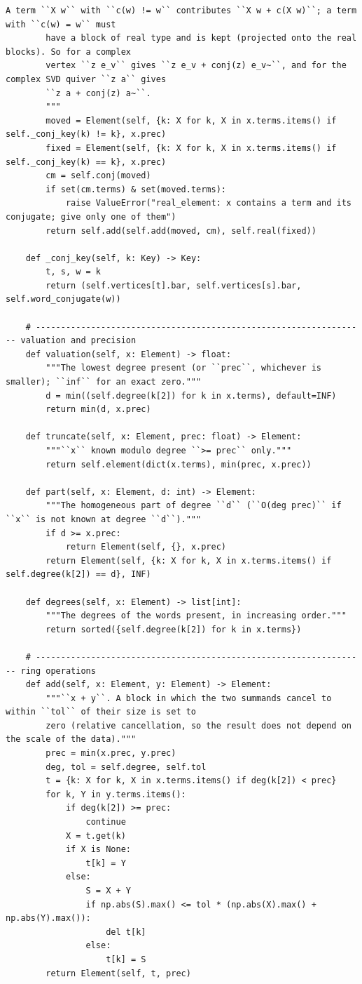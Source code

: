 \documentclass[12pt, a4paper]{report}
\theoremstyle{plain}
\theoremstyle{definition}
\theoremstyle{remark}
\theoremstyle{plain}
\begin{document}
\begin{lstlisting}[style=dsqcode]
        A term ``X w`` with ``c(w) != w`` contributes ``X w + c(X w)``; a term with ``c(w) = w`` must
        have a block of real type and is kept (projected onto the real blocks). So for a complex
        vertex ``z e_v`` gives ``z e_v + conj(z) e_v~``, and for the complex SVD quiver ``z a`` gives
        ``z a + conj(z) a~``.
        """
        moved = Element(self, {k: X for k, X in x.terms.items() if self._conj_key(k) != k}, x.prec)
        fixed = Element(self, {k: X for k, X in x.terms.items() if self._conj_key(k) == k}, x.prec)
        cm = self.conj(moved)
        if set(cm.terms) & set(moved.terms):
            raise ValueError("real_element: x contains a term and its conjugate; give only one of them")
        return self.add(self.add(moved, cm), self.real(fixed))

    def _conj_key(self, k: Key) -> Key:
        t, s, w = k
        return (self.vertices[t].bar, self.vertices[s].bar, self.word_conjugate(w))

    # ------------------------------------------------------------------ valuation and precision
    def valuation(self, x: Element) -> float:
        """The lowest degree present (or ``prec``, whichever is smaller); ``inf`` for an exact zero."""
        d = min((self.degree(k[2]) for k in x.terms), default=INF)
        return min(d, x.prec)

    def truncate(self, x: Element, prec: float) -> Element:
        """``x`` known modulo degree ``>= prec`` only."""
        return self.element(dict(x.terms), min(prec, x.prec))

    def part(self, x: Element, d: int) -> Element:
        """The homogeneous part of degree ``d`` (``O(deg prec)`` if ``x`` is not known at degree ``d``)."""
        if d >= x.prec:
            return Element(self, {}, x.prec)
        return Element(self, {k: X for k, X in x.terms.items() if self.degree(k[2]) == d}, INF)

    def degrees(self, x: Element) -> list[int]:
        """The degrees of the words present, in increasing order."""
        return sorted({self.degree(k[2]) for k in x.terms})

    # ------------------------------------------------------------------ ring operations
    def add(self, x: Element, y: Element) -> Element:
        """``x + y``. A block in which the two summands cancel to within ``tol`` of their size is set to
        zero (relative cancellation, so the result does not depend on the scale of the data)."""
        prec = min(x.prec, y.prec)
        deg, tol = self.degree, self.tol
        t = {k: X for k, X in x.terms.items() if deg(k[2]) < prec}
        for k, Y in y.terms.items():
            if deg(k[2]) >= prec:
                continue
            X = t.get(k)
            if X is None:
                t[k] = Y
            else:
                S = X + Y
                if np.abs(S).max() <= tol * (np.abs(X).max() + np.abs(Y).max()):
                    del t[k]
                else:
                    t[k] = S
        return Element(self, t, prec)


\end{lstlisting}
\end{document}

